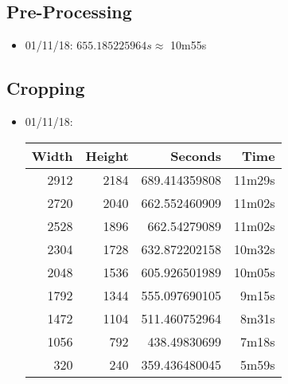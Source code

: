 \subsection{Pre-Processing}
\begin{itemize}
    \item 01/11/18: $655.185225964s \approx$ 10m55s
\end{itemize}

\subsection{Cropping}
\begin{itemize}
  \item 01/11/18:
  \begin{center}
  \begin{tabular}{ r r | r r }
  Width & Height & Seconds & Time \\ \hline
  2912 & 2184 & 689.414359808 & 11m29s \\
  2720 & 2040 & 662.552460909 & 11m02s \\
  2528 & 1896 & 662.54279089 & 11m02s \\
  2304 & 1728 & 632.872202158 & 10m32s \\
  2048 & 1536 & 605.926501989 & 10m05s \\
  1792 & 1344 & 555.097690105 & 9m15s \\
  1472 & 1104 & 511.460752964 & 8m31s \\
  1056 & 792 & 438.49830699 & 7m18s \\
  320 & 240 & 359.436480045 & 5m59s \\
  \end{tabular}
  \end{center}
\end{itemize}

